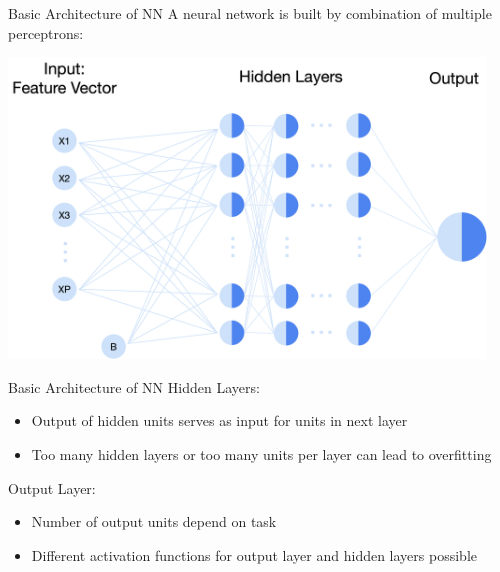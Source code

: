 \documentclass[11pt,compress,t,notes=noshow, xcolor=table]{beamer}
\begin{document}
\begin{vbframe}{Basic Architecture of NN}
\small A neural network is built by combination of multiple perceptrons:

\vspace{0.5cm}
\includegraphics[width = 0.95\textwidth]{slides/neural-networks/figure_man/nutshell-nn-basic-architecture.png}    
\end{vbframe}

\begin{vbframe}{Basic Architecture of NN}
Hidden Layers: 
     \begin{itemize}
         \item  Output of hidden units serves as input for units in next layer
         \item Too many hidden layers or too many units per layer can lead to overfitting
     \end{itemize}
Output Layer:
    \begin{itemize}
        \item Number of output units depend on task
        \item Different activation functions for output layer and hidden layers possible
    \end{itemize}

\end{vbframe}
\end{document}
